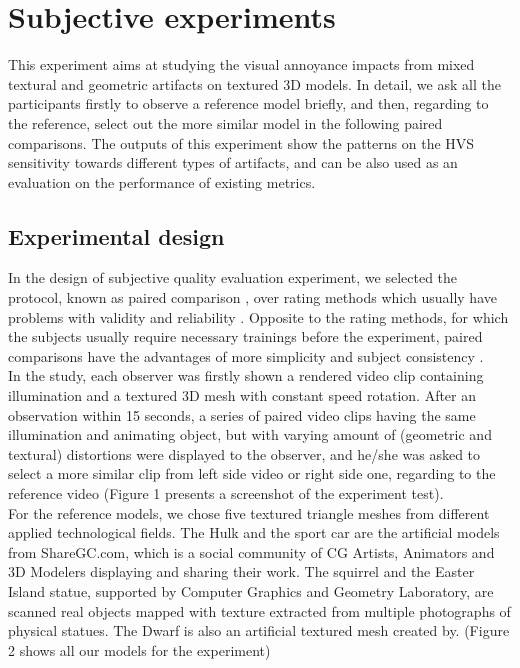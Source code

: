 \section{Subjective experiments}
This experiment aims at studying the visual annoyance impacts from mixed textural and geometric artifacts on textured 3D models. In detail, we ask all the participants firstly to observe a reference model briefly, and then, regarding to the reference, select out the more similar model in the following paired comparisons. The outputs of this experiment show the patterns on the HVS sensitivity towards different types of artifacts, and can be also used as an evaluation on the performance of existing metrics.
\subsection{Experimental design}
In the design of subjective quality evaluation experiment, we selected the protocol, known as paired comparison \cite{Lee_2011}, over rating methods which usually have problems with validity and reliability \cite{Govindarajulu_1992}. Opposite to the rating methods, for which the subjects usually require necessary trainings before the experiment, paired comparisons have the advantages of more simplicity and subject consistency \cite{Wills_2009}. \\
In the study, each observer was firstly shown a rendered video clip containing illumination and a textured 3D mesh with constant speed rotation. After an observation within 15 seconds, a series of paired video clips having the same illumination and animating object, but with varying amount of (geometric and textural) distortions were displayed to the observer, and he/she was asked to select a more similar clip from left side video or right side one, regarding to the reference video (Figure 1 presents a screenshot of the experiment test). \\
For the reference models, we chose five textured triangle meshes from different applied technological fields. The Hulk and the sport car are the artificial models from ShareGC.com, which is a social community of CG Artists, Animators and 3D Modelers displaying and sharing their work. The squirrel and the Easter Island statue, supported by Computer Graphics and Geometry Laboratory, are scanned real objects mapped with texture extracted from multiple photographs of physical statues. The Dwarf is also an artificial textured mesh created by. (Figure 2 shows all our models for the experiment)\\
